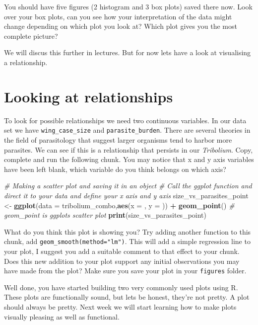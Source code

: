 \documentclass[
]{book}
\newenvironment{Shaded}{\begin{snugshade}}{\end{snugshade}}
\newcommand{\AttributeTok}[1]{\textcolor[rgb]{0.13,0.29,0.53}{#1}}
\newcommand{\CommentTok}[1]{\textcolor[rgb]{0.56,0.35,0.01}{\textit{#1}}}
\newcommand{\FunctionTok}[1]{\textcolor[rgb]{0.13,0.29,0.53}{\textbf{#1}}}
\newcommand{\NormalTok}[1]{#1}
\newcommand{\OtherTok}[1]{\textcolor[rgb]{0.56,0.35,0.01}{#1}}
\newcommand{\SpecialCharTok}[1]{\textcolor[rgb]{0.81,0.36,0.00}{\textbf{#1}}}
\begin{document}
You should have five figures (2 histogram and 3 box plots) saved there now. Look over your box plots, can you see how your interpretation of the data might change depending on which plot you look at? Which plot gives you the most complete picture?

We will discus this further in lectures. But for now lets have a look at visualising a relationship.

\section{Looking at relationships}\label{scatter}

To look for possible relationships we need two continuous variables. In our data set we have \texttt{wing\_case\_size} and \texttt{parasite\_burden}. There are several theories in the field of parasitology that suggest larger organisms tend to harbor more parasites. We can see if this is a relationship that persists in our \emph{Tribolium}. Copy, complete and run the following chunk. You may notice that x and y axis variables have been left blank, which variable do you think belongs on which axis?

\begin{Shaded}
\begin{Highlighting}[]
\CommentTok{\# Making a scatter plot and saving it in an object}
\CommentTok{\# Call the ggplot function and direct it to your data and define your x axis and y axis}
\NormalTok{size\_vs\_parasites\_point }\OtherTok{\textless{}{-}} \FunctionTok{ggplot}\NormalTok{(}\AttributeTok{data =}\NormalTok{ tribolium\_combo,}\FunctionTok{aes}\NormalTok{(}\AttributeTok{x =}\NormalTok{ , }\AttributeTok{y =}\NormalTok{ )) }\SpecialCharTok{+} 
  \FunctionTok{geom\_point}\NormalTok{() }\CommentTok{\# geom\_point is ggplots scatter plot}
\FunctionTok{print}\NormalTok{(size\_vs\_parasites\_point)}
\end{Highlighting}
\end{Shaded}

What do you think this plot is showing you? Try adding another function to this chunk, add \texttt{geom\_smooth(method="lm")}. This will add a simple regression line to your plot, I suggest you add a suitable comment to that effect to your chunk. Does this new addition to your plot support any initial observations you may have made from the plot? Make sure you save your plot in your \texttt{figures} folder.

Well done, you have started building two very commonly used plots using R. These plots are functionally sound, but lets be honest, they're not pretty. A plot should always be pretty. Next week we will start learning how to make plots visually pleasing as well as functional.
\end{document}

